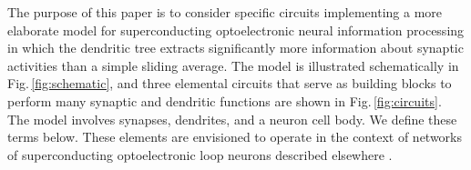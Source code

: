\documentclass[twocolumn]{article}
\begin{document}
\begin{figure}[tb]
\end{figure}
The purpose of this paper is to consider specific circuits implementing a more elaborate model for superconducting optoelectronic neural information processing in which the dendritic tree extracts significantly more information about synaptic activities than a simple sliding average. The model is illustrated schematically in Fig.\,\ref{fig:schematic}, and three elemental circuits that serve as building blocks to perform many synaptic and dendritic functions are shown in Fig.\,\ref{fig:circuits}. The model involves synapses, dendrites, and a neuron cell body. We define these terms below. These elements are envisioned to operate in the context of networks of superconducting optoelectronic loop neurons described elsewhere \cite{sh2018,sh2018_full}.
\end{document}
